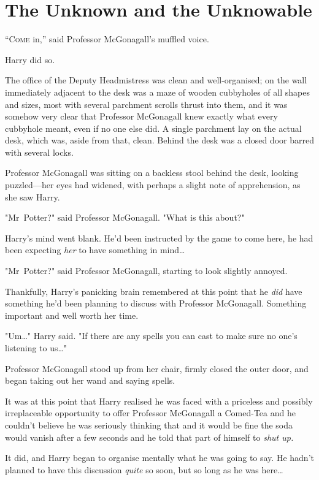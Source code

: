 \chapter{The Unknown and the Unknowable}

\lettrine{“C}{ome} in,” said Professor McGonagall's muffled voice.

\quad\quad
Harry did so.

The office of the Deputy Headmistress was clean and well-organised; on the wall
immediately adjacent to the desk was a maze of wooden cubbyholes of all shapes
and sizes, most with several parchment scrolls thrust into them, and it was
somehow very clear that Professor McGonagall knew exactly what every cubbyhole
meant, even if no one else did. A single parchment lay on the actual desk,
which was, aside from that, clean. Behind the desk was a closed door barred
with several locks.

Professor McGonagall was sitting on a backless stool behind the desk, looking
puzzled—her eyes had widened, with perhaps a slight note of apprehension, as
she saw Harry.

"Mr~Potter?" said Professor McGonagall. "What is this about?"

Harry's mind went blank. He'd been instructed by the game to come here, he had
been expecting \emph{her} to have something in mind…

"Mr~Potter?" said Professor McGonagall, starting to look slightly annoyed.

Thankfully, Harry's panicking brain remembered at this point that he \emph{did}
have something he'd been planning to discuss with Professor McGonagall.
Something important and well worth her time.

"Um…" Harry said. "If there are any spells you can cast to make sure no
one's listening to us…"

Professor McGonagall stood up from her chair, firmly closed the outer door, and
began taking out her wand and saying spells.

It was at this point that Harry realised he was faced with a priceless and
possibly irreplaceable opportunity to offer Professor McGonagall a Comed-Tea
and he couldn't believe he was seriously thinking that and it would be fine the
soda would vanish after a few seconds and he told that part of himself to
\emph{shut up.}

It did, and Harry began to organise mentally what he was going to say. He
hadn't planned to have this discussion \emph{quite} so soon, but so long as he
was here…

